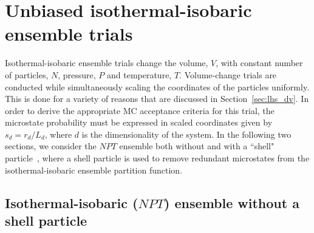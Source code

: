 \documentclass[
  9pt,
  bestpractices,
]{livecoms}
\begin{document}

\section{\label{sec:rhs_npt}Unbiased isothermal-isobaric ensemble trials}

Isothermal-isobaric ensemble trials change the volume, $V$, with constant number of particles, $N$, pressure, $P$ and temperature, $T$.
Volume-change trials are conducted while simultaneously scaling the coordinates of the particles uniformly.
This is done for a variety of reasons that are discussed in Section~\ref{sec:lhs_dv}.
In order to derive the appropriate MC acceptance criteria for this trial, the microstate probability must be expressed in scaled coordinates given by $s_d = r_d/L_d$, where $d$ is the dimensionality of the system.
In the following two sections, we consider the $NPT$ ensemble both without and with a ``shell" particle~\cite{koper_length_1996, corti_deriving_1998, hatch_theory_2024}, where a shell particle is used to remove redundant microstates from the isothermal-isobaric ensemble partition function.

\subsection{\label{sec:rhs_npt_shell}Isothermal-isobaric ($NPT$) ensemble without a shell particle}
\end{document}

